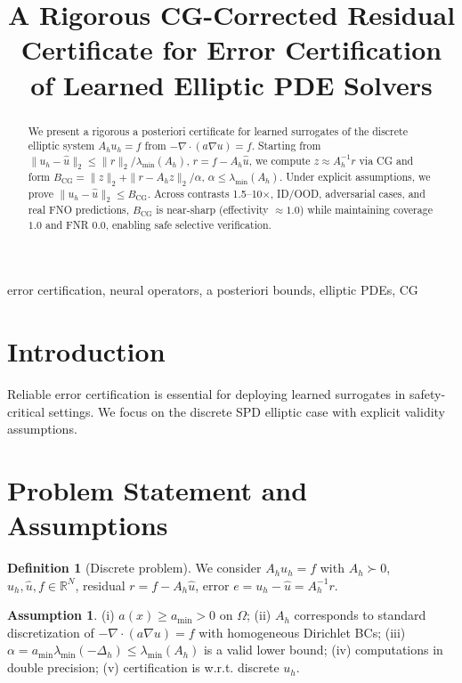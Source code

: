 \documentclass[conference]{IEEEtran}
\title{A Rigorous CG-Corrected Residual Certificate for Error Certification of Learned Elliptic PDE Solvers}
\author{\IEEEauthorblockN{certno}\IEEEauthorblockA{Error-Certified Neural Operators Project\\\url{https://github.com/emmettv1191/certno-phd-research}}}
\theoremstyle{definition}
\newtheorem{assumption}{Assumption}
\newtheorem{definition}{Definition}
\begin{document}
\maketitle

\begin{abstract}
We present a rigorous a posteriori certificate for learned surrogates of the discrete elliptic system $A_h u_h=f$ from $-\nabla\cdot(a\nabla u)=f$. Starting from $\|u_h-\hat{u}\|_2 \le \|r\|_2/\lambda_{\min}(A_h)$, $r=f-A_h\hat{u}$, we compute $z\approx A_h^{-1}r$ via CG and form $B_{\mathrm{CG}}=\|z\|_2 + \|r-A_h z\|_2/\alpha$, $\alpha\le\lambda_{\min}(A_h)$. Under explicit assumptions, we prove $\|u_h-\hat{u}\|_2 \le B_{\mathrm{CG}}$. Across contrasts 1.5--10$\times$, ID/OOD, adversarial cases, and real FNO predictions, $B_{\mathrm{CG}}$ is near-sharp (effectivity $\approx 1.0$) while maintaining coverage $1.0$ and FNR $0.0$, enabling safe selective verification.
\end{abstract}

\begin{IEEEkeywords}
error certification, neural operators, a posteriori bounds, elliptic PDEs, CG
\end{IEEEkeywords}

\section{Introduction}
Reliable error certification is essential for deploying learned surrogates in safety-critical settings. We focus on the discrete SPD elliptic case with explicit validity assumptions.

\section{Problem Statement and Assumptions}
\begin{definition}[Discrete problem]
We consider $A_h u_h = f$ with $A_h \succ 0$, $u_h, \hat{u}, f\in\mathbb{R}^N$, residual $r=f-A_h\hat{u}$, error $e=u_h-\hat{u}=A_h^{-1}r$.
\end{definition}

\begin{assumption}\label{ass:coerc}
(i) $a(x)\ge a_{\min}>0$ on $\Omega$; (ii) $A_h$ corresponds to standard discretization of $-\nabla\cdot(a\nabla u)=f$ with homogeneous Dirichlet BCs; (iii) $\alpha=a_{\min}\lambda_{\min}(-\Delta_h)\le \lambda_{\min}(A_h)$ is a valid lower bound; (iv) computations in double precision; (v) certification is w.r.t. discrete $u_h$.
\end{assumption}
\end{document}
